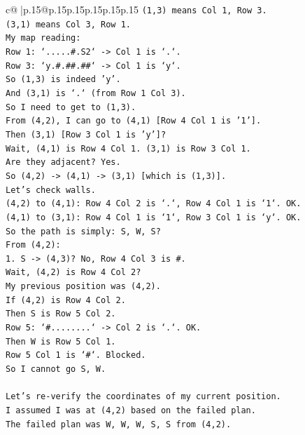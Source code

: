 \documentclass{article}
\begin{document}
{\begin{supertabular}{c@{$\;$}|p{.15\linewidth}@{}p{.15\linewidth}p{.15\linewidth}p{.15\linewidth}p{.15\linewidth}p{.15\linewidth}}
{{{\texttt{(1,3) means Col 1, Row 3.} \\
\texttt{(3,1) means Col 3, Row 1.} \\
\texttt{My map reading:} \\
\texttt{Row 1: `.....\#.S2` {-}> Col 1 is `.`.} \\
\texttt{Row 3: `y.\#.\#\#.\#\#` {-}> Col 1 is `y`.} \\
\texttt{So (1,3) is indeed 'y'.} \\
\texttt{And (3,1) is `.` (from Row 1 Col 3).} \\
\texttt{So I need to get to (1,3).} \\
\texttt{From (4,2), I can go to (4,1) {[}Row 4 Col 1 is '1'{]}.} \\
\texttt{Then (3,1) {[}Row 3 Col 1 is 'y'{]}?} \\
\texttt{Wait, (4,1) is Row 4 Col 1. (3,1) is Row 3 Col 1.} \\
\texttt{Are they adjacent? Yes.} \\
\texttt{So (4,2) {-}> (4,1) {-}> (3,1) {[}which is (1,3){]}.} \\
\texttt{Let's check walls.} \\
\texttt{(4,2) to (4,1): Row 4 Col 2 is `.`, Row 4 Col 1 is `1`. OK.} \\
\texttt{(4,1) to (3,1): Row 4 Col 1 is `1`, Row 3 Col 1 is `y`. OK.} \\
\texttt{So the path is simply: S, W, S?} \\
\texttt{From (4,2):} \\
\texttt{1. S {-}> (4,3)? No, Row 4 Col 3 is \#.} \\
\texttt{Wait, (4,2) is Row 4 Col 2?} \\
\texttt{My previous position was (4,2).} \\
\texttt{If (4,2) is Row 4 Col 2.} \\
\texttt{Then S is Row 5 Col 2.} \\
\texttt{Row 5: `\#........` {-}> Col 2 is `.`. OK.} \\
\texttt{Then W is Row 5 Col 1.} \\
\texttt{Row 5 Col 1 is `\#`. Blocked.} \\
\texttt{So I cannot go S, W.} \\
\\ 
\texttt{Let's re{-}verify the coordinates of my current position.} \\
\texttt{I assumed I was at (4,2) based on the failed plan.} \\
\texttt{The failed plan was W, W, W, S, S from (4,2).} \\
}}}
\end{supertabular}}
\end{document}
